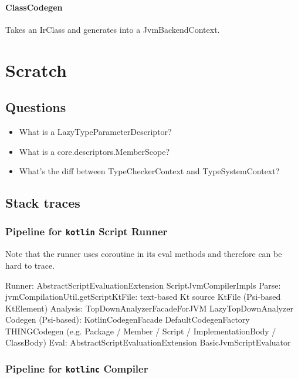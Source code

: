 \documentclass{article}
\begin{document}
\paragraph{ClassCodegen}
Takes an IrClass and generates into a JvmBackendContext.

\section{Scratch}

\subsection{Questions}

\begin{itemize}
    \item What is a LazyTypeParameterDescriptor?
    \item What is a core.descriptors.MemberScope?
    \item What's the diff between TypeCheckerContext and TypeSystemContext?
\end{itemize}

\subsection{Stack traces}

\subsubsection{Pipeline for \texttt{kotlin} Script Runner}
Note that the runner uses coroutine in its eval methods and therefore can be hard to trace.

Runner: AbstractScriptEvaluationExtension \textSafeTo ScriptJvmCompilerImpls
Parse: jvmCompilationUtil.getScriptKtFile: text-based Kt source \textSafeTo KtFile (Psi-based KtElement)
Analysis: TopDownAnalyzerFacadeForJVM \textSafeTo LazyTopDownAnalyzer
Codegen (Psi-based): KotlinCodegenFacade \textSafeTo DefaultCodegenFactory \textSafeTo THINGCodegen (e.g. Package / Member / Script / ImplementationBody / ClassBody)
Eval: AbstractScriptEvaluationExtension \textSafeTo BasicJvmScriptEvaluator

\subsubsection{Pipeline for \texttt{kotlinc} Compiler}
\end{document}
